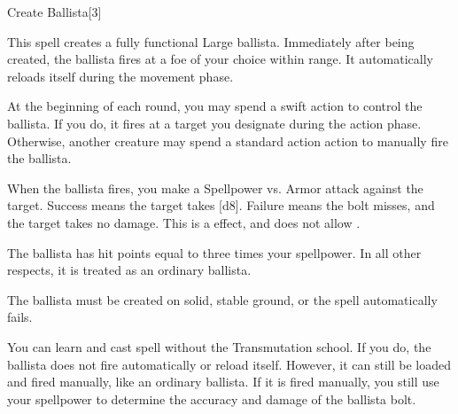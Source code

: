 \begin{spellsection}{Create Ballista}[3]
    \begin{spellheader}
    \end{spellheader}
    \begin{spellcontent}
        \begin{spelltargetinginfo}
        \end{spelltargetinginfo}
        \begin{spelleffects}
            \spelleffect This spell creates a fully functional Large ballista.
            Immediately after being created, the ballista fires at a foe of your choice within \rnglong range.
            It automatically reloads itself during the movement phase.

            At the beginning of each round, you may spend a swift action to control the ballista.
            If you do, it fires at a target you designate during the action phase.
            Otherwise, another creature may spend a standard action action to manually fire the ballista.

            When the ballista fires, you make a Spellpower  vs. Armor attack against the target.
            Success means the target takes [d8].
            Failure means the bolt misses, and the target takes no damage.
            This is a  effect, and does not allow .

            The ballista has hit points equal to three times your spellpower.
            In all other respects, it is treated as an ordinary ballista.
            \spelldur \durshort
        \end{spelleffects}
    \end{spellcontent}
    \begin{spellfooter}
        \spellnotes The ballista must be created on solid, stable ground, or the spell automatically fails.

        You can learn and cast spell without the Transmutation school.
        If you do, the ballista does not fire automatically or reload itself.
        However, it can still be loaded and fired manually, like an ordinary ballista.
        If it is fired manually, you still use your spellpower to determine the accuracy and damage of the ballista bolt.
        \miscastexplode
    \end{spellfooter}
    \begin{spellaugments}
    \end{spellaugments}
\end{spellsection}

